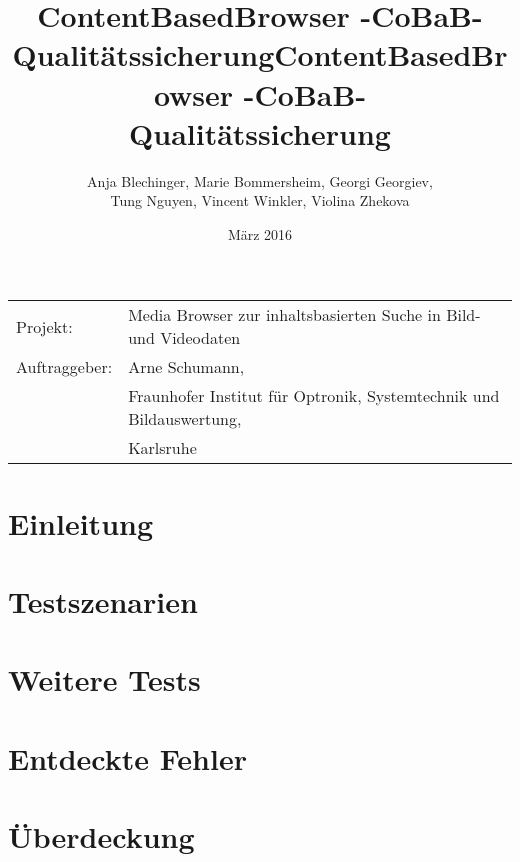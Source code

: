 \documentclass[parskip=full]{scrartcl}
\title{ContentBasedBrowser -CoBaB- \\ Qualitätssicherung}
\begin{document}
\begin{titlepage}
\title{ContentBasedBrowser -CoBaB- \\ Qualitätssicherung}
\author{Anja Blechinger, Marie Bommersheim, Georgi Georgiev,\\ Tung Nguyen, Vincent Winkler, Violina Zhekova}
\date{März 2016}
\maketitle
\vspace{300pt}
\begin{tabular}{l l}
Projekt: & Media Browser zur inhaltsbasierten Suche in Bild- und Videodaten\\
Auftraggeber: & Arne Schumann,\\
 & Fraunhofer Institut für Optronik, Systemtechnik und Bildauswertung,\\
 & Karlsruhe\\
\end{tabular}
\thispagestyle{empty}
\end{titlepage}
\setcounter{page}{1}

\tableofcontents
\pagebreak

\section{Einleitung}

\pagebreak

\section{Testszenarien}

\pagebreak

\section{Weitere Tests}

\pagebreak

\section{Entdeckte Fehler}

\pagebreak

\section{Überdeckung}

\pagebreak
\end{document}
